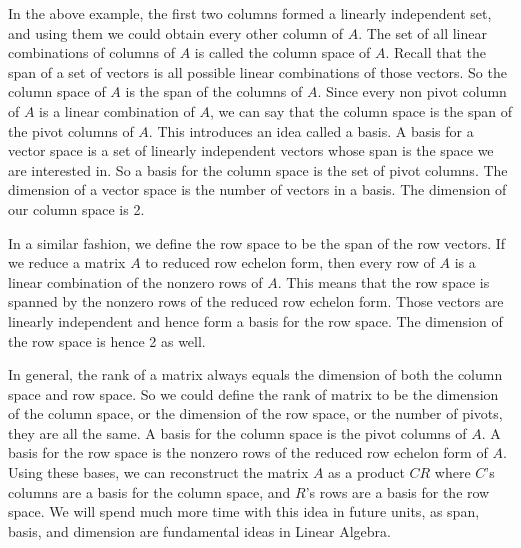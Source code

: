 \documentclass[10pt]{article}
\begin{document}
In the above example, the first two columns formed a linearly independent set, and using them we could obtain every other column of $A$.  The set of all linear combinations of columns of $A$ is called the column space of $A$.  Recall that the span of a set of vectors is all possible linear combinations of those vectors.  So the column space of $A$ is the span of the columns of $A$.  Since every non pivot column of $A$ is a linear combination of $A$, we can say that the column space is the span of the pivot columns of $A$.  This introduces an idea called a basis.  A basis for a vector space is a set of linearly independent vectors whose span is the space we are interested in.  So a basis for the column space is the set of pivot columns. The dimension of a vector space is the number of vectors in a basis.  The dimension of our column space is 2.

In a similar fashion, we define the row space to be the span of the row vectors. If we reduce a matrix $A$ to reduced row echelon form, then every row of $A$ is a linear combination of the nonzero rows of $A$. This means that the row space is spanned by the nonzero rows of the reduced row echelon form. Those vectors are linearly independent and hence form a basis for the row space.  The dimension of the row space is hence 2 as well.

In general, the rank of a matrix always equals the dimension of both the column space and row space. So we could define the rank of matrix to be the dimension of the column space, or the dimension of the row space, or the number of pivots, they are all the same. A basis for the column space is the pivot columns of $A$.  A basis for the row space is the nonzero rows of the reduced row echelon form of $A$.  Using these bases, we can reconstruct the matrix $A$ as a product $CR$ where $C$'s columns are a basis for the column space, and $R$'s rows are a basis for the row space.  We will spend much more time with this idea in future units, as span, basis, and dimension are fundamental ideas in Linear Algebra.
\end{document}
